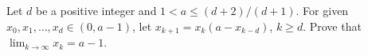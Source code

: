 Let $d$ be a positive integer and $1 < a \le (d+2)/(d+1)$. For given $x_0, x_1,\dots, x_d \in (0, a-1)$, let $x_{k+1} = x_k (a - x_{k-d})$, $k \ge d$. Prove that $\lim_{k \to \infty} x_k = a-1$.